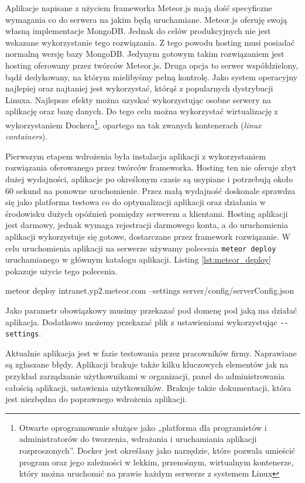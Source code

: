Aplikacje napisane z użyciem frameworka Meteor.js mają dość specyficzne wymagania co do serwera na jakim będą uruchamiane. Meteor.js oferuję swoją własną implementacje MongoDB. Jednak do celów produkcyjnych nie jest wskazane wykorzystanie tego rozwiązania. Z tego powodu hosting musi posiadać normalną wersję bazy MongoDB. Jedynym gotowym takim rozwiązaniem jest hosting oferowany przez twórców Meteor.js. Druga opcja to serwer współdzielony, bądź dedykowany, na którym mielibyśmy pełną kontrolę. Jako system operacyjny najlepiej oraz najtaniej jest wykorzystać, którąś z popularnych dystrybucji Linuxa. Najlepsze efekty można uzyskać wykorzystując osobne serwery na aplikację oraz bazę danych. Do tego celu można wykorzystać wirtualizację z wykorzystaniem Dockera\footnote{Otwarte oprogramowanie służące jako „platforma dla programistów i administratorów do tworzenia, wdrażania i uruchamiania aplikacji rozproszonych”. Docker jest określany jako narzędzie, które pozwala umieścić program oraz jego zależności w lekkim, przenośnym, wirtualnym kontenerze, który można uruchomić na prawie każdym serwerze z systemem Linux}, opartego na tak zwanych kontenerach (\textit{linux containers}). 

Pierwszym etapem wdrożenia była instalacja aplikacji z wykorzystaniem rozwiązania oferowanego przez twórców frameworka. Hosting ten nie oferuje zbyt dużej wydajności, aplikacje po określonym czasie są usypiane i potrzebują około 60 sekund na ponowne uruchomienie. Przez małą wydajność doskonale sprawdza się jako platforma testowa co do optymalizacji aplikacji oraz działania w środowisku dużych opóźnień pomiędzy serwerem a klientami. Hosting aplikacji jest darmowy, jednak wymaga rejestracji darmowego konta, a do uruchomienia aplikacji wykorzystuje się gotowe, dostarczane przez framework rozwiązanie. W celu uruchomienia aplikacji na serwerze używamy polecenia \verb|meteor deploy| uruchamianego w głównym katalogu aplikacji. Listing \ref{lst:meteor_deploy} pokazuje użycie tego polecenia. 
\begin{bash}[caption={Uruchomienie aplikacji na serwerze},label={lst:meteor_deploy}]
meteor deploy intranet.yp2.meteor.com --settings server/config/serverConfig.json
\end{bash}
Jako parametr obowiązkowy musimy przekazać pod domenę pod jaką ma działać aplikacja. Dodatkowo możemy przekazać plik z ustawieniami wykorzystując \verb|--settings|.

Aktualnie aplikacja jest w fazie testowania przez pracowników firmy. Naprawiane są zgłaszane błędy. Aplikacji brakuje także kilku kluczowych elementów jak na przykład zarządzanie użytkownikami w organizacji, panel do administrowania całością aplikacji, ustawienia użytkowników. Brakuje także dokumentacji, która jest niezbędna do poprawnego wdrożenia aplikacji.

